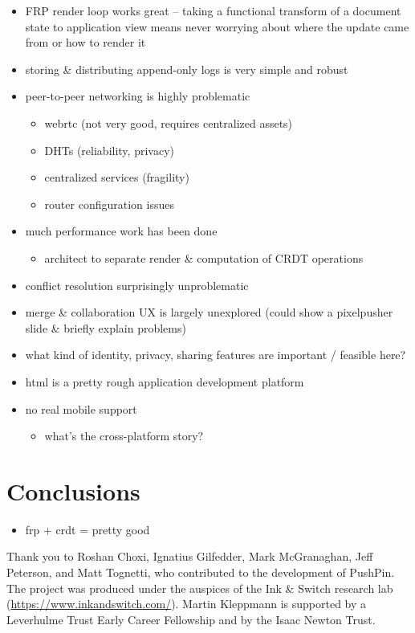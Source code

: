 \documentclass[sigplan,10pt]{acmart}
\begin{document}
\begin{itemize}
    \item FRP render loop works great -- taking a functional transform of a document state to application view means never worrying about where the update came from or how to render it
	\item storing \& distributing append-only logs is very simple and robust
    \item peer-to-peer networking is highly problematic
    \begin{itemize}
	    \item webrtc (not very good, requires centralized assets)
		\item DHTs (reliability, privacy)
		\item centralized services (fragility)
		\item router configuration issues
	\end{itemize}
	\item much performance work has been done
	\begin{itemize}
	    \item architect to separate render \& computation of CRDT operations
	\end{itemize}
	\item conflict resolution surprisingly unproblematic
	\item merge \& collaboration UX is largely unexplored (could show a pixelpusher slide \& briefly explain problems)
	\item what kind of identity, privacy, sharing features are important / feasible here?
	\item html is a pretty rough application development platform
	\item no real mobile support
	\begin{itemize}
	    \item what's the cross-platform story?
	\end{itemize}
\end{itemize}

\section{Conclusions}
\begin{itemize}
	\item frp + crdt = pretty good
\end{itemize}

\begin{acks}
Thank you to Roshan Choxi, Ignatius Gilfedder, Mark McGranaghan, Jeff Peterson, and Matt Tognetti, who contributed to the development of PushPin.
The project was produced under the auspices of the Ink \& Switch research lab (\url{https://www.inkandswitch.com/}).
Martin Kleppmann is supported by a Leverhulme Trust Early Career Fellowship and by the Isaac Newton Trust.
\end{acks}


{}
\end{document}
